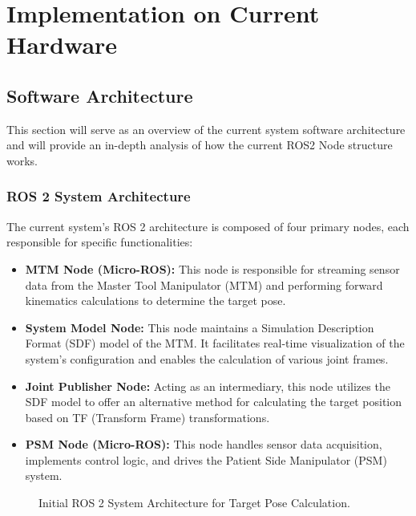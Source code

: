\chapter{Implementation on Current Hardware}

\section{Software Architecture}

This section will serve as an overview of the current system software architecture and will provide an in-depth analysis of how the current ROS2 Node structure works.

\subsection{ROS 2 System Architecture}

The current system's ROS 2 architecture is composed of four primary nodes, each responsible for specific functionalities:

\begin{itemize}
    \item \textbf{MTM Node (Micro-ROS):} This node is responsible for streaming sensor data from the Master Tool Manipulator (MTM) and performing forward kinematics calculations to determine the target pose.
    \item \textbf{System Model Node:} This node maintains a Simulation Description Format (SDF) model of the MTM. It facilitates real-time visualization of the system's configuration and enables the calculation of various joint frames.
    \item \textbf{Joint Publisher Node:} Acting as an intermediary, this node utilizes the SDF model to offer an alternative method for calculating the target position based on TF (Transform Frame) transformations.
    \item \textbf{PSM Node (Micro-ROS):} This node handles sensor data acquisition, implements control logic, and drives the Patient Side Manipulator (PSM) system.
\end{itemize}

\begin{figure}[h!]
    \centering
    \caption{Initial ROS 2 System Architecture for Target Pose Calculation.}
    \label{fig:initial_architecture}
\end{figure}

